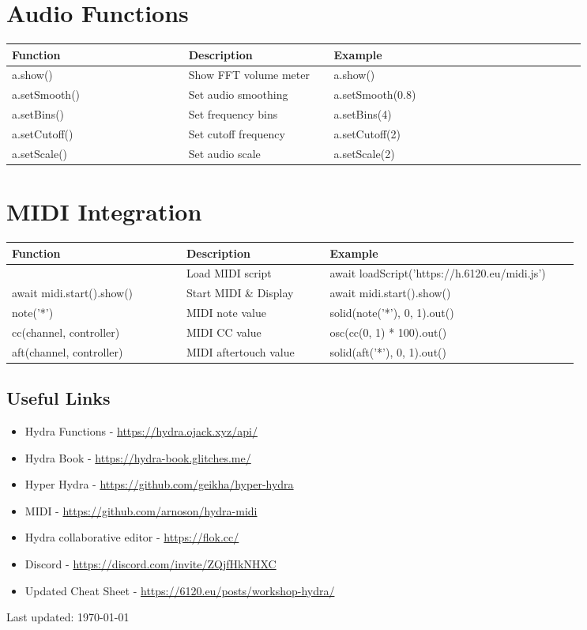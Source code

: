 \documentclass[9pt,oneside]{amsart}
\begin{document}
\section*{Audio Functions}
\begin{tabular}{L{0.28\linewidth}L{0.23\linewidth}L{0.40\linewidth}}
\toprule
\textbf{Function} & \textbf{Description} & \textbf{Example} \\
\midrule
a.show() & Show FFT volume meter & a.show() \\
a.setSmooth() & Set audio smoothing & a.setSmooth(0.8) \\
a.setBins() & Set frequency bins & a.setBins(4) \\
a.setCutoff() & Set cutoff frequency & a.setCutoff(2) \\
a.setScale() & Set audio scale & a.setScale(2) \\
\bottomrule
\end{tabular}

\section*{MIDI Integration}
\begin{tabular}{L{0.28\linewidth}L{0.23\linewidth}L{0.40\linewidth}}
\toprule
\textbf{Function} & \textbf{Description} & \textbf{Example} \\
\midrule
 & Load MIDI script & await loadScript('https://h.6120.eu/midi.js') \\
await midi.start().show() & Start MIDI \& Display & await midi.start().show() \\
note('*') & MIDI note value & solid(note('*'), 0, 1).out() \\
cc(channel, controller) & MIDI CC value & osc(cc(0, 1) * 100).out() \\
aft(channel, controller) & MIDI aftertouch value & solid(aft('*'), 0, 1).out() \\
\bottomrule
\end{tabular}

\subsection*{Useful Links}
\begin{itemize}
\item Hydra Functions - \url{https://hydra.ojack.xyz/api/}
\item Hydra Book - \url{https://hydra-book.glitches.me/}
\item Hyper Hydra - \url{https://github.com/geikha/hyper-hydra}
\item MIDI - \url{https://github.com/arnoson/hydra-midi}
\item Hydra collaborative editor - \url{https://flok.cc/}
\item Discord - \url{https://discord.com/invite/ZQjfHkNHXC}
\item Updated Cheat Sheet - \url{https://6120.eu/posts/workshop-hydra/}
\end{itemize}

Last updated: \today
\end{document}
